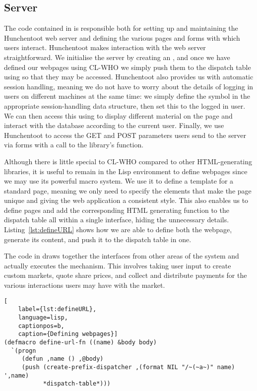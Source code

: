 \subsection{Server}

The code contained in  is responsible both for setting up and
maintaining the Hunchentoot web server and defining the various pages and forms
with which users interact.  Hunchentoot makes interaction with the web server
straightforward. We initialise the server by creating an ,
and once we have defined our webpages using CL-WHO we simply push them to the
dispatch table using  so that they may be
accessed. Hunchentoot also provides us with automatic session handling, meaning
we do not have to worry about the details of logging in users on different
machines at the same time: we simply define the symbol  in
the appropriate session-handling data structure, then set this to the logged in
user. We can then access this using  to
display different material on the page and interact with the database according
to the current user. Finally, we use Hunchentoot to access the GET and POST
parameters users send to the server via forms with a call to the library's
 function. 

Although there is little special to CL-WHO compared to other HTML-generating
libraries, it is useful to remain in the Lisp environment to define webpages
since we may use its powerful macro system. We use it to define a template for
a standard page, meaning we only need to specify the elements that make the
page unique and giving the web application a consistent style. This also
enables us to define pages and add the corresponding HTML generating function
to the dispatch table all within a single interface, hiding the unnecessary
details. Listing~\ref{lst:defineURL} shows how we are able to define both the
webpage, generate its content, and push it to the dispatch table in one.

The code in  draws together the interfaces from other areas
of the system and actually executes the mechanism. This involves taking user
input to create custom markets, quote share prices, and collect and distribute
payments for the various interactions users may have with the market.

\begin{lstlisting}[
	label={lst:defineURL},
	language=lisp,
	captionpos=b,
	caption={Defining webpages}]
(defmacro define-url-fn ((name) &body body)
  `(progn
     (defun ,name () ,@body)
     (push (create-prefix-dispatcher ,(format NIL "/~(~a~)" name) ',name)
           *dispatch-table*)))
\end{lstlisting}


